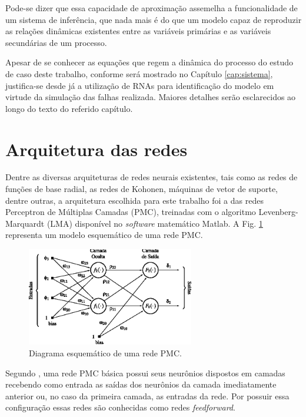 Pode-se dizer que essa capacidade de aproximação assemelha a funcionalidade de
um sistema de inferência, que nada mais é do que um modelo capaz de reproduzir
as relações dinâmicas existentes entre as variáveis primárias e as variáveis
secundárias de um processo.

Apesar de se conhecer as equações que regem a dinâmica do processo do estudo de
caso deste trabalho, conforme será mostrado no Capítulo \ref{cap:sistema},
justifica-se desde já a utilização de RNAs para identificação do modelo em
virtude da simulação das falhas realizada. Maiores detalhes serão esclarecidos
ao longo do texto do referido capítulo.

\section{Arquitetura das redes}
Dentre as diversas arquiteturas de redes neurais existentes, tais como as redes
de funções de base radial, as redes de Kohonen, máquinas de vetor de suporte,
dentre outras, a arquitetura escolhida para este trabalho foi a das redes
Perceptron de Múltiplas Camadas (PMC), treinadas com o algoritmo
Levenberg-Marquardt (LMA) disponível no {\it software} matemático Matlab\reg. A
Fig. \ref{fig:pmc} representa um modelo esquemático de uma rede PMC.

\begin{figure}[htb]
\centering
    \includegraphics[width=0.65\textwidth]{imgs/rnas/eps/pmc}
    \caption{Diagrama esquemático de uma rede PMC.}
    \label{fig:pmc}
\end{figure}


Segundo , uma rede PMC básica possui seus neurônios
dispostos em camadas recebendo como entrada as saídas dos neurônios da camada
imediatamente anterior ou, no caso da primeira camada, as entradas da rede. Por
possuir essa configuração essas redes são conhecidas como redes {\it
feedforward}.

